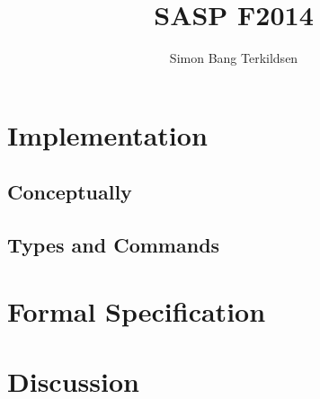 \documentclass[citeauthoryear]{llncs} %
\title{SASP F2014}
\author{Simon Bang Terkildsen}
\institute{IT University of Copenhagen}
\begin{document}
\maketitle

\begin{abstract}

\end{abstract}



\section{Implementation}

\subsection{Conceptually}




\subsection{Types and Commands}




\section{Formal Specification}



\section{Discussion}






\end{document}
